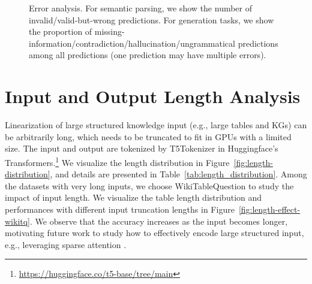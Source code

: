 \documentclass[11pt]{article}
\begin{document}
\begin{figure*}[t]
\centering
\caption{\label{fig:error-analysis-full} Error analysis. For semantic parsing, we show the number of invalid/valid-but-wrong predictions. For generation tasks, we show the proportion of missing-information/contradiction/hallucination/ungrammatical predictions among all predictions (one prediction may have multiple errors). }
\end{figure*}
  
\section{Input and Output Length Analysis}
\label{length_analysis}
\def\infinity{\rotatebox{90}{8}}

Linearization of large structured knowledge input (e.g., large tables and KGs) can be arbitrarily long, which needs to be truncated to fit in GPUs with a limited size. The input and output are tokenized by T5Tokenizer in Huggingface's Transformers.\footnote{\url{https://huggingface.co/t5-base/tree/main}} We visualize the length distribution in Figure~\ref{fig:length-distribution}, and details are presented in Table~\ref{tab:length_distribution}. 
Among the datasets with very long inputs,
we choose WikiTableQuestion to study the impact of input length.
We visualize the table length distribution and performances with different input truncation lengths in Figure~\ref{fig:length-effect-wikitq}.
We observe that the accuracy increases as the input becomes longer, 
motivating future work to study how to effectively encode large structured input, e.g., leveraging sparse attention \cite{Zaheer2020BigBT}. 
\end{document}
